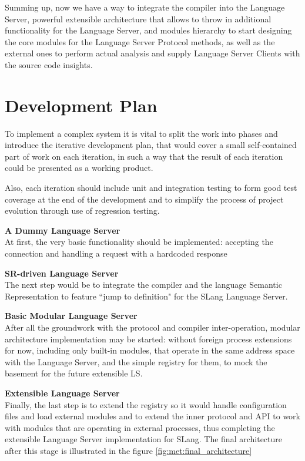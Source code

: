 Summing up, now we have a way to integrate the compiler into the Language Server, powerful extensible architecture
that allows to throw in additional functionality for the Language Server,
and modules hierarchy to start designing the core modules for the Language Server Protocol methods, as well as
the external ones to perform actual analysis and supply Language Server Clients with the source code insights.

\section{Development Plan}
To implement a complex system it is vital to split the work into phases and introduce
the iterative development plan, that would cover a small self-contained part of work on each iteration,
in such a way that the result of each iteration could be presented as a working product.

Also, each iteration should include unit and integration testing to form good test coverage
at the end of the development and to simplify the process of project evolution through use of regression testing.

\textbf{A Dummy Language Server} \\
At first, the very basic functionality should be implemented: accepting the connection and handling a request with a hardcoded response

\textbf{SR-driven Language Server}\\
The next step would be to integrate the compiler and the language Semantic Representation
to feature ``jump to definition" for the SLang Language Server.

\textbf{Basic Modular Language Server}\\
After all the groundwork with the protocol and compiler inter-operation,
modular architecture implementation may be started: without foreign process extensions for now,
including only built-in modules, that operate in the same address space with the Language Server,
and the simple registry for them, to mock the basement for the future extensible LS.

\textbf{Extensible Language Server}\\
Finally, the last step is to extend the registry so it would handle configuration files
and load external modules and to extend the inner protocol and API to work with modules that are operating
in external processes, thus completing the extensible Language Server implementation for SLang.
The final architecture after this stage is illustrated in the figure \ref{fig:met:final_architecture}


